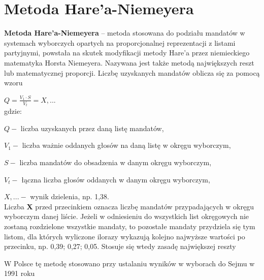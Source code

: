 \documentclass[12pt,a4paper,titlepage]{report}
\begin{document}
\chapter{Metoda Hare’a-Niemeyera}
\textbf{Metoda Hare’a-Niemeyera} – metoda stosowana do podziału mandatów w systemach wyborczych opartych na proporcjonalnej reprezentacji z listami partyjnymi, powstała na skutek modyfikacji metody Hare’a przez niemieckiego matematyka Horsta Niemeyera. Nazywana jest także metodą największych reszt\cite{mhn} lub matematycznej proporcji.
Liczbę uzyskanych mandatów oblicza się za pomocą wzoru\cite{mhn}

\begin{math} Q={\frac {V_{1}\cdot S}{V_{t}}}=X,...\end{math}\\
gdzie:

\begin{math}Q-\end{math} liczba uzyskanych przez daną listę mandatów,

\begin{math}V_1-\end{math} liczba ważnie oddanych głosów na daną listę w okręgu wyborczym,

\begin{math}S-\end{math} liczba mandatów do obsadzenia w danym okręgu wyborczym,

\begin{math}V_t-\end{math} łączna liczba głosów oddanych w danym okręgu wyborczym,

\begin{math}X,...-\end{math} wynik dzielenia, np. 1,38. \\
Liczba \textbf{X} przed przecinkiem oznacza liczbę mandatów przypadających w okręgu wyborczym danej liście. Jeżeli w odniesieniu do wszystkich list okręgowych nie zostaną rozdzielone wszystkie mandaty, to pozostałe mandaty przydziela się tym listom, dla których wyliczone ilorazy wykazują kolejno najwyższe wartości po przecinku, np. 0,39; 0,27; 0,05. Stosuje się wtedy zasadę największej reszty\cite{mhn}

W Polsce tę metodę stosowano przy ustalaniu wyników w wyborach do Sejmu w 1991 roku\cite{uj}\cite{wiki:mhn}
\newpage
\end{document}
